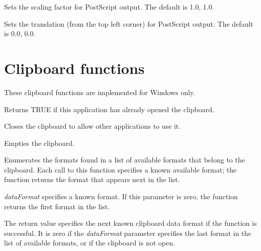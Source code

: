 

Sets the scaling factor for PostScript output. The default is 1.0, 1.0.



Sets the translation (from the top left corner) for PostScript output. The default is 0.0, 0.0.

\section{Clipboard functions}\label{clipsboard}

These clipboard functions are implemented for Windows only.



Returns TRUE if this application has already opened the clipboard.



Closes the clipboard to allow other applications to use it.



Empties the clipboard.



Enumerates the formats found in a list of available formats that belong
to the clipboard. Each call to this  function specifies a known
available format; the function returns the format that appears next in
the list. 

{\it dataFormat} specifies a known format. If this parameter is zero,
the function returns the first format in the list. 

The return value specifies the next known clipboard data format if the
function is successful. It is zero if the {\it dataFormat} parameter specifies
the last  format in the list of available formats, or if the clipboard
is not open. 

